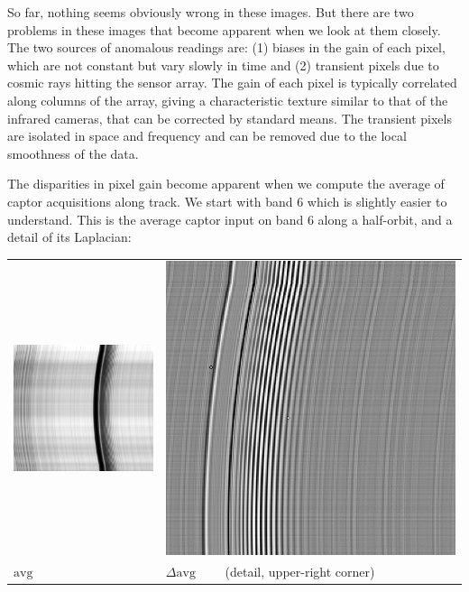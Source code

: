 \documentclass[a4paper]{article}    %
\theoremstyle{note}
\theoremstyle{plain}
\begin{document}
So far, nothing seems obviously wrong in these images.  But there are two
problems in these images that become apparent when we look at them closely.
The two sources of anomalous readings are: (1) biases in the gain of each
pixel, which are not constant but vary slowly in time and (2) transient
pixels due to cosmic rays hitting the sensor array.  The gain of each pixel
is typically correlated along columns of the array, giving a characteristic
texture similar to that of the infrared cameras, that can be corrected by
standard means.  The transient pixels are isolated in space and frequency and
can be removed due to the local smoothness of the data.

The disparities in pixel gain become apparent when we compute the average
of captor acquisitions along track.  We start with band 6 which is slightly
easier to understand.  This is the average captor input on band 6 along a
half-orbit, and a detail of its Laplacian:

\begin{tabular}{ll}
	\includegraphics[width=0.5\linewidth]{f/b6_avgs.png} &
	\includegraphics[width=0.5\linewidth]{f/b6_lapavgs.png} \\
	$\mathrm{avg}$ & $\Delta\mathrm{avg}\qquad$ (detail, upper-right corner)
\end{tabular}
\end{document}
